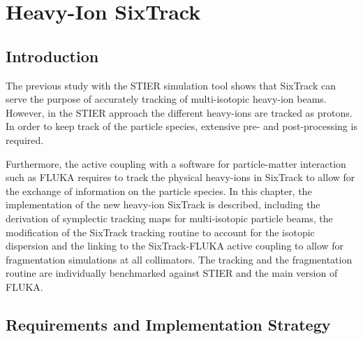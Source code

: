 \chapter{Heavy-Ion SixTrack} \label{chap:hisix}

\section*{Introduction}
The previous study with the STIER simulation tool shows that SixTrack can serve the purpose of accurately tracking of multi-isotopic heavy-ion beams. However, in the STIER approach the different heavy-ions are tracked as protons. In order to keep track of the particle species, extensive pre- and post-processing is required. 

Furthermore, the active coupling with a software for particle-matter interaction such as FLUKA requires to track the physical heavy-ions in SixTrack to allow for the exchange of information on the particle species. In this chapter, the implementation of the new heavy-ion SixTrack is described, including the derivation of symplectic tracking maps for multi-isotopic particle beams, the modification of the SixTrack tracking routine to account for the isotopic dispersion and the linking to the SixTrack-FLUKA active coupling to allow for fragmentation simulations at all collimators. The tracking and the fragmentation routine are individually benchmarked against STIER and the main version of FLUKA.

\section{Requirements and Implementation Strategy}

